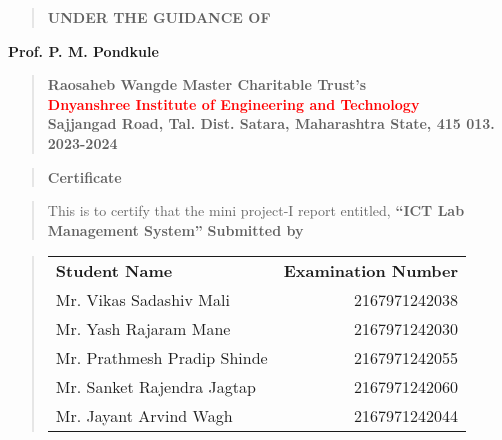 \documentclass[12pt]{report}
\begin{document}
	\vspace{0.5cm}
	\begin{quote}
		\centering
		\large
		\textbf{UNDER THE GUIDANCE OF}
	\end{quote}
	\textbf{Prof. P. M. Pondkule}
	\vspace{0.5cm}
	\begin{quote}
		\centering
		\vspace{0.5cm}
		\bfseries
		\textbf{Raosaheb Wangde Master Charitable Trust's}\\
		\textcolor{red}{Dnyanshree Institute of Engineering and Technology}\\
		Sajjangad Road, Tal. Dist. Satara, Maharashtra State, 415 013.\\ 2023-2024
	\end{quote}
	\vspace{0.5cm}
	
	\newpage
	
	
	
	
	\begin{quote}
		\centering
		\LARGE
		\textbf{Certificate}
	\end{quote}
	
	\begin{quote}
		\normalsize
		\centering
		This is to certify that the mini project-I report entitled, \textbf{``ICT Lab Management System''}
		\textbf{Submitted by}\\[1ex]
	\end{quote}
	
	\begin{quote}
		
\begin{table}[ht]
	\centering
	\begin{tabular}{l@{}r}
		\bfseries
		Student Name & \bfseries Examination Number \\[2ex]
		Mr. Vikas Sadashiv Mali & 2167971242038\\[1ex]
		Mr. Yash Rajaram Mane & 2167971242030\\[1ex]
		Mr. Prathmesh Pradip Shinde & 2167971242055\\[1ex]
		Mr. Sanket Rajendra Jagtap & 2167971242060\\[1ex]
		Mr. Jayant Arvind Wagh & 2167971242044\\[1ex]
	\end{tabular}
\end{table}

	\end{quote}
	
\end{document}
